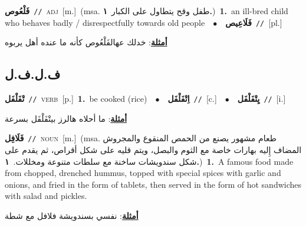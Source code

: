\documentclass[10pt,a4paper,twoside]{article} %
\begin{document}
\begin{multicols}{2}
{\setlength\topsep{0pt}\textbf{\foreignlanguage{arabic}{فَلْعُوص}}\ {\color{gray}\texttt{//}\color{black}}\ \textsc{adj}\ [m.]\ \color{gray}(msa. \foreignlanguage{arabic}{طفل وقح يتطاول على الكبار}~\foreignlanguage{arabic}{\textbf{١.}})\color{black}\ \textbf{1.}~an ill-bred child who behaves badly / disrespectfully towards old people\ \ $\bullet$\ \ \setlength\topsep{0pt}\textbf{\foreignlanguage{arabic}{فَلَاعِيص}}\ {\color{gray}\texttt{//}\color{black}}\ [pl.]\  \begin{flushright}\color{gray}\foreignlanguage{arabic}{\textbf{\underline{\foreignlanguage{arabic}{أمثلة}}}: خدلك عهالفَلْعُوص كأنه ما عنده أهل يربوه}\end{flushright}\color{black}} \vspace{2mm}

\vspace{-3mm}
\subsection*{\color{blue}\foreignlanguage{arabic}{ف.ل.ف.ل}\color{blue}{}} 

{\setlength\topsep{0pt}\textbf{\foreignlanguage{arabic}{تْفَلْفَل}}\ {\color{gray}\texttt{//}\color{black}}\ \textsc{verb}\ [p.]\ \textbf{1.}~be cooked (rice)\ \ $\bullet$\ \ \setlength\topsep{0pt}\textbf{\foreignlanguage{arabic}{اِتْفَلْفَل}}\ {\color{gray}\texttt{//}\color{black}}\ [c.]\ \ $\bullet$\ \ \setlength\topsep{0pt}\textbf{\foreignlanguage{arabic}{يِتْفَلْفَل}}\ {\color{gray}\texttt{//}\color{black}}\ [i.]\  \begin{flushright}\color{gray}\foreignlanguage{arabic}{\textbf{\underline{\foreignlanguage{arabic}{أمثلة}}}: ما أحلاه هالرز بيتْفَلْفَل بسرعة}\end{flushright}\color{black}} \vspace{2mm}

{\setlength\topsep{0pt}\textbf{\foreignlanguage{arabic}{فَلَافِل}}\ {\color{gray}\texttt{//}\color{black}}\ \textsc{noun}\ [m.]\ \color{gray}(msa. \foreignlanguage{arabic}{طعام مشهور يصنع من الحمص المنقوع والمجروش المضاف إِليه بهارات خاصة مع الثوم والبصل، ويتم قليه على شكل أقراص، ثم يقدم على شكل سندويشات ساخنة مع سلطات متنوعة ومخللات.}~\foreignlanguage{arabic}{\textbf{١.}})\color{black}\ \textbf{1.}~A famous food made from chopped, drenched hummus, topped with special spices with garlic and onions, and fried in the form of tablets, then served in the form of hot sandwiches with salad and pickles.\  \begin{flushright}\color{gray}\foreignlanguage{arabic}{\textbf{\underline{\foreignlanguage{arabic}{أمثلة}}}: نفسي بسندويشة فلافل مع شطة}\end{flushright}\color{black}} \vspace{2mm}


\end{multicols}
\end{document}
